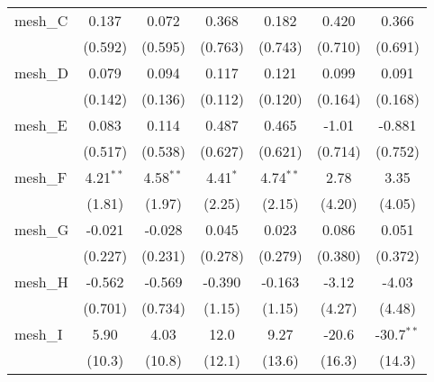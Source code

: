 \begin{tabular}{lcccccc}
   mesh\_C                                                     & 0.137         & 0.072         & 0.368         & 0.182         & 0.420        & 0.366\\   
                                                               & (0.592)       & (0.595)       & (0.763)       & (0.743)       & (0.710)      & (0.691)\\   
   mesh\_D                                                     & 0.079         & 0.094         & 0.117         & 0.121         & 0.099        & 0.091\\   
                                                               & (0.142)       & (0.136)       & (0.112)       & (0.120)       & (0.164)      & (0.168)\\   
   mesh\_E                                                     & 0.083         & 0.114         & 0.487         & 0.465         & -1.01        & -0.881\\   
                                                               & (0.517)       & (0.538)       & (0.627)       & (0.621)       & (0.714)      & (0.752)\\   
   mesh\_F                                                     & 4.21$^{**}$   & 4.58$^{**}$   & 4.41$^{*}$    & 4.74$^{**}$   & 2.78         & 3.35\\   
                                                               & (1.81)        & (1.97)        & (2.25)        & (2.15)        & (4.20)       & (4.05)\\   
   mesh\_G                                                     & -0.021        & -0.028        & 0.045         & 0.023         & 0.086        & 0.051\\   
                                                               & (0.227)       & (0.231)       & (0.278)       & (0.279)       & (0.380)      & (0.372)\\   
   mesh\_H                                                     & -0.562        & -0.569        & -0.390        & -0.163        & -3.12        & -4.03\\   
                                                               & (0.701)       & (0.734)       & (1.15)        & (1.15)        & (4.27)       & (4.48)\\   
   mesh\_I                                                     & 5.90          & 4.03          & 12.0          & 9.27          & -20.6        & -30.7$^{**}$\\   
                                                               & (10.3)        & (10.8)        & (12.1)        & (13.6)        & (16.3)       & (14.3)\\   

\end{tabular}
